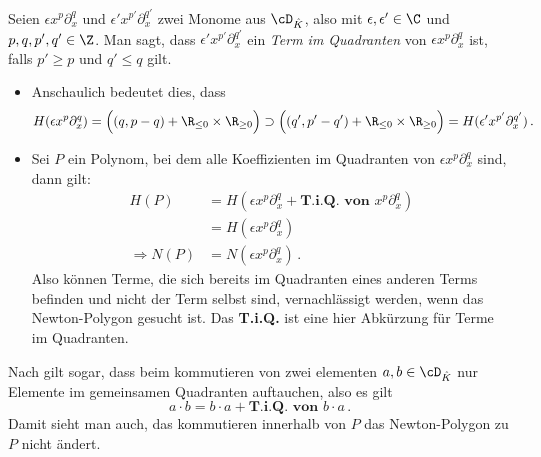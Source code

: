\begin{defn}
Seien $\epsilon x^{p}\partial_x^{q}$ und $\epsilon' x^{p'}\partial_x^{q'}$ zwei
Monome aus $\cD_{\hat K}$, also mit $\epsilon, \epsilon'\in \C$ und $p,q,p',q'
\in \Z$. Man sagt, dass $\epsilon' x^{p'}\partial_x^{q'}$ ein \emph{Term im
Quadranten} von $\epsilon x^{p}\partial_x^{q}$ ist, falls $p'\geq p$ und
$q'\leq q$ gilt.
\begin{comment}
In einem Polynom
$P=\epsilon x^{p}\partial_x^{q}
+\sum^{n}_{k=0}\big(\sum^{\infty}_{l=-N}{\alpha_{kl}x^l\big)\partial_x^k}$,
mit $\alpha_{kl}\in \C$ sind die restlichen Monome
\emph{Terme im Quadranten} von $\epsilon x^{p}\partial_x^{q}$, falls für alle
einzelnen Monome schon Terme im Quadranten von $\epsilon x^{p}\partial_x^{q}$
sind.
\end{comment}
\end{defn}
\begin{bem}
\begin{itemize}
\item Anschaulich bedeutet dies, dass
\[
H(\epsilon x^{p}\partial_x^{q})
=\Big( (q,p-q) + \R_{\leq 0} \times \R_{\geq 0} \Big) \supset
\Big( (q',p'-q') + \R_{\leq 0} \times \R_{\geq 0} \Big)
=H(\epsilon' x^{p'}\partial_x^{q'}) \,.
\]
\item Sei $P$ ein Polynom, bei dem alle Koeffizienten im Quadranten von
$\epsilon x^{p}\partial_x^{q}$ sind, dann gilt:
\begin{align*}
H(P)&=H(\epsilon x^{p}\partial_x^{q} + \textbf{T.i.Q. von }x^{p}\partial_x^{q})
\\&=H(\epsilon x^{p}\partial_x^{q})
\\\Rightarrow N(P)&=N(\epsilon x^{p}\partial_x^{q}) \,.
\end{align*}
Also können Terme, die sich bereits im Quadranten eines anderen Terms
befinden und nicht der Term selbst sind, vernachlässigt werden, wenn das
Newton-Polygon gesucht ist. Das \textbf{T.i.Q.} ist eine hier Abkürzung für
Terme im Quadranten.
\end{itemize}
\end{bem}
\begin{bem} \label{bem:commutateWithTiQ}
Nach \cite{sabbah_cimpa90} gilt sogar, dass beim kommutieren von zwei
elementen $a,b\in\cD_{\hat K}$ nur Elemente im gemeinsamen Quadranten
auftauchen, also es gilt
\[
a\cdot b = b\cdot a +  \textbf{T.i.Q. von }b\cdot a \,.
\]
Damit sieht man auch, das kommutieren innerhalb von $P$ das Newton-Polygon zu
$P$ nicht ändert.
\end{bem}
\begin{comment}
\begin{exmp}
\[
(x^a\partial_x^b)^c
=x^{ac}\partial_x^{bc}+\textbf{T.i.Q. von }x^{ac}\partial_x^{bc}
\]
und somit gilt
\begin{align*}
N((x^a\partial_x^b)^c)
  &=N(x^{ac}\partial_x^{bc}+\textbf{T.i.Q. von }x^{ac}\partial_x^{bc})
\\&=N(x^{ac}\partial_x^{bc})
\end{align*}
\end{exmp}
\end{comment}

